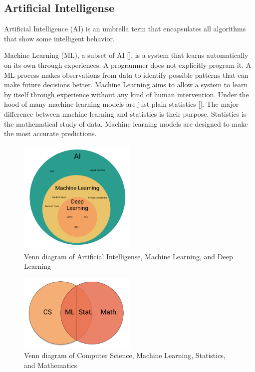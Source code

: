 \subsection{Artificial Intelligense}
Artificial Intelligence (AI) is an umbrella term that encapsulates all algorithms that
show some intelligent behavior.

Machine Learning (ML), a subset of AI [], is a system that learns automatically on its own through experiences.
A programmer does not explicitly program it. A ML process makes observations from data to identify possible
patterns that can make future decisions better. Machine Learning aims to allow a system to learn by itself through
experience without any kind of human intervention. Under the hood of many machine learning models are just plain statistics [].
The major difference between machine learning and statistics is their purpose.
Statistics is the mathematical study of data.
Machine learning models are designed to make the most accurate predictions.


\begin{figure}[h!]
  \centering
  \includegraphics[width=0.5\textwidth]{./figs/illustrations/illustration_venn_diagram_ml_deep_learning.png}
  \hfill
  \caption{Venn diagram of Artificial Intelligense, Machine Learning, and Deep Learning}
  \label{fig:venn-diagram-ml-deep-learning}
\end{figure}
\begin{figure}[h!]
  \centering
  \includegraphics[width=0.5\textwidth]{./figs/illustrations/illustration_venn_diagram_cs_ml_stat_math.png}
  \hfill
  \caption{Venn diagram of Computer Science, Machine Learning, Statistics, and Mathematics}
  \label{fig:venn-diagram-cs-ml-deep-learning}
\end{figure}